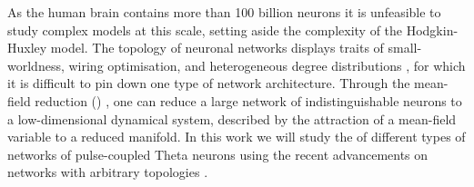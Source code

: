 As the human brain contains more than 100 billion neurons \cite{Herculano2009} it is unfeasible to study complex models at this scale, setting aside the complexity of the Hodgkin-Huxley model. The topology of neuronal networks displays traits of small-worldness, wiring optimisation, and heterogeneous degree distributions \cite{Bullmore2010}, for which it is difficult to pin down one type of network architecture. Through the mean-field reduction (\MFR) \cite{OttAntonsen2008, OttAntonsen2009, OttAntonsen2010}, one can reduce a large network of indistinguishable neurons to a low-dimensional dynamical system, described by the attraction of a mean-field variable to a reduced manifold.
In this work we will study the \MFR of different types of networks of pulse-coupled Theta neurons using the recent advancements on networks with arbitrary topologies \cite{OttAntonsen2017}. \\




